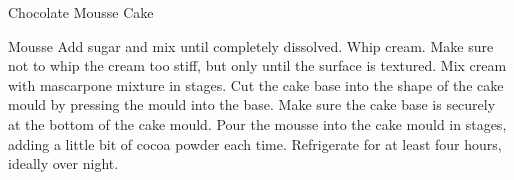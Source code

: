 \documentclass[10pt, a4paper]{article}
\begin{document}
\begin{recipe}{Chocolate Mousse Cake}
\begin{procedure}
\begin{proceduregroup}{Mousse}
				\step Add sugar and mix until completely dissolved.
				\step Whip cream. Make sure not to whip the cream too stiff, but only until the surface is textured.
				\step Mix cream with mascarpone mixture in stages.
				\step Cut the cake base into the shape of the cake mould by pressing the mould into the base.
				\step Make sure the cake base is securely at the bottom of the cake mould.
				\step Pour the mousse into the cake mould in stages, adding a little bit of cocoa powder each time.
				\step Refrigerate for at least four hours, ideally over night.
			\end{proceduregroup}
		\end{procedure}
	\end{recipe}
\end{document}

